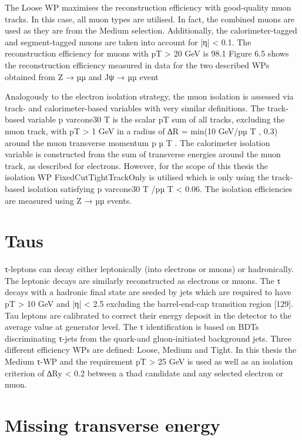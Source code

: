 The Loose WP maximises the reconstruction efficiency with good-quality muon tracks. In this case,
all muon types are utilised. In fact, the combined muons are used as they are from the Medium
selection. Additionally, the calorimeter-tagged and segment-tagged muons are taken into account for
|η| < 0.1. The reconstruction efficiency for muons with pT > 20 GeV is 98.1%
Figure 6.5 shows the reconstruction efficiency measured in data for the two described WPs obtained
from Z → µµ and Jψ → µµ event

Analogously to the electron isolation strategy, the muon isolation is assessed via track- and calorimeter-based variables with very similar definitions. The track-based variable p
varcone30
T
is the scalar pT sum
of all tracks, excluding the muon track, with pT > 1 GeV in a radius of ∆R = min(10 GeV/pµ
T
, 0.3)
around the muon transverse momentum p
µ
T
. The calorimeter isolation variable is constructed from
the sum of transverse energies around the muon track, as described for electrons. However, for the
scope of this thesis the isolation WP FixedCutTightTrackOnly is utilised which is only using the
track-based isolation satisfying p
varcone30
T
/pµ
T < 0.06. The isolation efficiencies are measured using
Z → µµ events.

\section{Taus}

τ-leptons can decay either leptonically (into electrons or muons) or hadronically. The leptonic decays
are similarly reconstructed as electrons or muons. The τ decays with a hadronic final state are seeded
by jets which are required to have pT > 10 GeV and |η| < 2.5 excluding the barrel-end-cap transition
region [129]. Tau leptons are calibrated to correct their energy deposit in the detector to the average
value at generator level. The τ identification is based on BDTs discriminating τ-jets from the quark-and gluon-initiated background jets. Three different efficiency WPs are defined: Loose, Medium
and Tight. In this thesis the Medium τ-WP and the requirement pT > 25 GeV is used as well as an
isolation criterion of ∆Ry < 0.2 between a τhad candidate and any selected electron or muon.

\section{Missing transverse energy}

